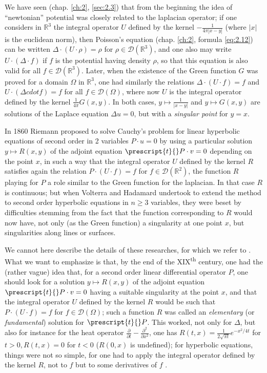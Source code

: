 \documentclass[12pt,a4paper,leqno,twoside]{extbook}
\newcommand{\supth}{\texorpdfstring{\textsuperscript{th}}{th}}
\newcommand{\R}{\mathbb{R}}
\newcommand{\pder}[2]{\frac{\partial #1}{\partial #2}}
\begin{document}
We have seen (chap. \ref{ch:2}, \ref{sec:2.3}) that from the beginning the idea of ``newtonian'' potential was closely related to the laplacian operator; if one considers in \(\R^3\) the integral operator \(U\) defined by the kernel \(-\frac{1}{4\pi|x-y|}\) (where \(|x|\) is the euclidean norm), then Poisson's equation (chap. \ref{ch:2}, formula \eqref{eq:2.12}) can be written \(\Delta \cdot (U \cdot \rho) = \rho\) for \(\rho \in \mathcal{D}(\R^3)\), and one also may write \(U \cdot (\Delta \cdot f)\) if \(f\) is the potential having density \(\rho\), so that this equation is also valid for all \(f \in \mathcal{D}(\R^3)\). Later, when the existence of the Green function \(G\) was proved for a domain \(\Omega\) in \(\R^3\), one had similarly the relations \(\Delta \cdot (U \cdot f) = f\) and \(U \cdot (\Delta cdot f) = f\) for all \(f \in \mathcal{D}(\Omega)\), where now \(U\) is the integral operator defined by the kernel \(\frac{1}{4\pi}G(x,y)\). In both cases, \(y \mapsto \frac{1}{|x-y|}\) and \(y \mapsto G(x,y)\) are solutions of the Laplace equation \(\Delta u = 0\), but with a \emph{singular point} for \(y=x\).

In 1860 Riemann proposed to solve Cauchy's problem for linear hyperbolic equations of second order in 2 variables \(P \cdot u = 0\) by using a particular solution \(y \mapsto R(x, y)\) of the adjoint equation \(\prescript{t}{}P \cdot v = 0\) depending on the point \(x\), in such a way that the integral operator \(U\) defined by the kernel \(R\) satisfies again the relation \(P \cdot (U \cdot f) = f\) for \(f \in \mathcal{D}(\R^2)\), the function \(R\) playing for \(P\) a role similar to the Green function for the laplacian. In that case \(R\) is continuous; but when Volterra and Hadamard undertook to extend the method to second order hyperbolic equations in \(n \geq 3\) variables, they were beset by difficulties stemming from the fact that the function corresponding to \(R\) would now have, not only (as the Green function) a singularity at one point \(x\), but singularities along lines or surfaces.

We cannot here describe the details of these researches, for which we refer to \cite{093}. What we want to emphasize is that, by the end of the XIX\supth{} century, one had the (rather vague) idea that, for a second order linear differential operator \(P\), one should look for a solution \(y \mapsto R(x,y)\) of the adjoint equation \(\prescript{t}{}P \cdot v = 0\) having a suitable singularity at the point \(x\), and that the integral operator \(U\) defined by the kernel \(R\) would be such that \(P \cdot (U \cdot f) = f\) for \(f \in \mathcal{D}(\Omega)\); such a function \(R\) was called an \emph{elementary} (or \emph{fundamental}) solution for \(\prescript{t}{}P\). This worked, not only for \(\Delta\), but also for instance for the heat operator \(\pder{}{t} - \pder{^2}{x^2}\), one has \(R(t,x) = \frac{1}{2\sqrt{\pi t}} e^{-x^2/4t}\) for \(t > 0, R(t,x) = 0\) for \(t < 0\) (\(R(0,x)\) is undefined); for hyperbolic equations, things were not so simple, for one had to apply the integral operator defined by the kernel \(R\), not to \(f\) but to some derivatives of \(f\) \cite{122}.
\end{document}
